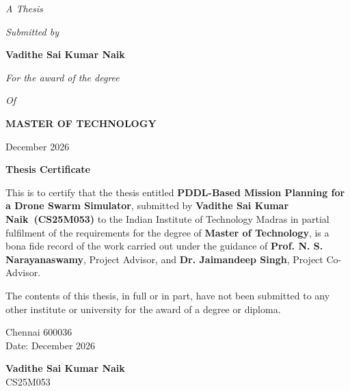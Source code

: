 \documentclass[11pt,a4paper,oneside]{report}
\newcommand{\thesistitle}{PDDL-Based Mission Planning for a Drone Swarm Simulator}
\newcommand{\authorname}{Vadithe Sai Kumar Naik}
\newcommand{\rollno}{CS25M053}
\newcommand{\submitdate}{December 2026}
\newcommand{\advisor}{Prof. N. S. Narayanaswamy}
\newcommand{\coadvisor}{Dr. Jaimandeep Singh}
\begin{document}
\begin{titlepage}
\begin{center}
  \vspace{1.6cm}
  {\itshape A Thesis\par}
  \vspace{0.25cm}
  {\itshape Submitted by\par}
  \vspace{0.3cm}
  {\Large\bfseries \authorname\par}
  \vspace{1.0cm}
  {\itshape For the award of the degree\par}
  \vspace{0.25cm}
  {\itshape Of\par}
  \vspace{0.25cm}
  {\bfseries MASTER OF TECHNOLOGY\par}
  \vspace{0.2cm}
  \submitdate
\end{center}
\end{titlepage}

\thispagestyle{empty}
\begin{center}
  {\LARGE\bfseries Thesis Certificate\par}
\end{center}
\vspace{0.8cm}
\noindent This is to certify that the thesis entitled \textbf{\thesistitle}, submitted by
\textbf{\authorname\ (\rollno)} to the Indian Institute of Technology Madras in partial
fulfilment of the requirements for the degree of \textbf{Master of Technology}, is a bona fide
record of the work carried out under the guidance of \textbf{\advisor}, Project Advisor, and
\textbf{\coadvisor}, Project Co-Advisor.

\noindent The contents of this thesis, in full or in part, have not been submitted to any other
institute or university for the award of a degree or diploma.

\vspace{2.2cm}
\noindent
\begin{minipage}[t]{0.5\textwidth}
  Chennai 600036\\
  Date: \submitdate
\end{minipage}%
\begin{minipage}[t]{0.5\textwidth}
  \raggedleft{}
  \textbf{\authorname}\\
  \rollno
\end{minipage}
\end{document}
